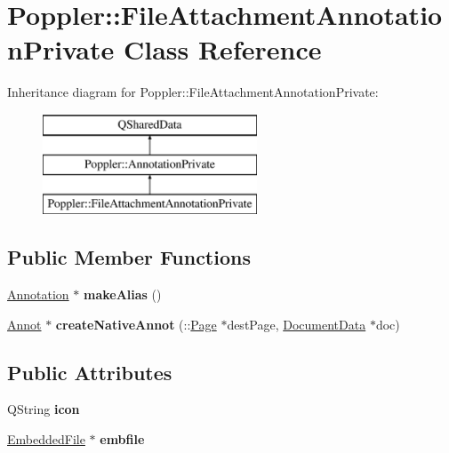 \hypertarget{class_poppler_1_1_file_attachment_annotation_private}{}\section{Poppler\+:\+:File\+Attachment\+Annotation\+Private Class Reference}
\label{class_poppler_1_1_file_attachment_annotation_private}
Inheritance diagram for Poppler\+:\+:File\+Attachment\+Annotation\+Private\+:\begin{figure}[H]
\begin{center}
\leavevmode
\includegraphics[height=3.000000cm]{class_poppler_1_1_file_attachment_annotation_private}
\end{center}
\end{figure}
\subsection*{Public Member Functions}
\begin{DoxyCompactItemize}
\item 
\mbox{\label{class_poppler_1_1_file_attachment_annotation_private_a481825e19f168a4d71ed7a5a16046daf}} 
\hyperlink{class_poppler_1_1_annotation}{Annotation} $\ast$ {\bfseries make\+Alias} ()
\item 
\mbox{\label{class_poppler_1_1_file_attachment_annotation_private_a4668e2774c08279694f3d36a7d225108}} 
\hyperlink{class_annot}{Annot} $\ast$ {\bfseries create\+Native\+Annot} (\+::\hyperlink{class_poppler_1_1_page}{Page} $\ast$dest\+Page, \hyperlink{class_poppler_1_1_document_data}{Document\+Data} $\ast$doc)
\end{DoxyCompactItemize}
\subsection*{Public Attributes}
\begin{DoxyCompactItemize}
\item 
\mbox{\label{class_poppler_1_1_file_attachment_annotation_private_ad9bd959e10d191b36aa54250d7320e35}} 
Q\+String {\bfseries icon}
\item 
\mbox{\label{class_poppler_1_1_file_attachment_annotation_private_aa71086b131c654fc9e87040fb17d3def}} 
\hyperlink{class_poppler_1_1_embedded_file}{Embedded\+File} $\ast$ {\bfseries embfile}
\end{DoxyCompactItemize}
